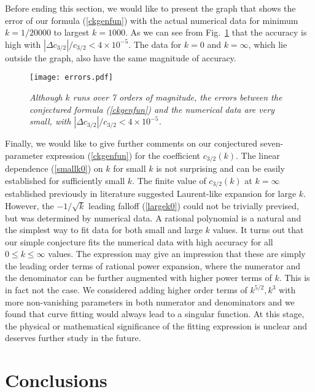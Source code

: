 \documentclass[11pt]{article}
\begin{document}
Before ending this section, we would like to present the graph that shows the error of our formula (\ref{ckgenfun}) with the actual numerical data for minimum $k=1/20000$ to largest $k=1000$.  As we can see from Fig.~\ref{error} that the accuracy is high with $|\Delta c_{3/2}|/c_{3/2}<4\times 10^{-5}$.  The data for $k=0$ and $k=\infty$, which lie outside the graph, also have the same magnitude of accuracy.

\begin{figure}[htp]
\begin{center}
\texttt{[image: errors.pdf]}
\end{center}
\caption{\small\it Although $k$ runs over 7 orders of magnitude, the errors between the conjectured formula (\ref{ckgenfun}) and the numerical data are very small, with $|\Delta c_{3/2}|/c_{3/2}<4\times 10^{-5}$.
}
\label{error}
\end{figure}

Finally, we would like to give further comments on our conjectured seven-parameter expression (\ref{ckgenfun}) for the coefficient $c_{3/2}(k)$. The linear dependence (\ref{smallk0}) on $k$ for small $k$ is not surprising and can be easily established for sufficiently small $k$. The finite value of $c_{3/2}(k)$ at $k=\infty$ established previously in literature suggested Laurent-like expansion for large $k$.  However, the $-1/\sqrt{k}$ leading falloff (\ref{largek0}) could not be trivially prevised, but was determined by numerical data.  A rational polynomial is a natural and the simplest way to fit data for both small and large $k$ values. It turns out that our simple conjecture fits the numerical data with high accuracy for all $0\le k \le \infty$ values. The expression may give an impression that these are simply the leading order terms of rational power expansion, where the numerator and the denominator can be further augmented with higher power terms of $k$. This is in fact not the case. We considered adding higher order terms of $k^{5/2}, k^3$ with more non-vanishing parameters in both numerator and denominators and we found that curve fitting would always lead to a singular function. At this stage, the physical or mathematical significance of the fitting expression is unclear and deserves further study in the future. 



\section{Conclusions}
\end{document}
